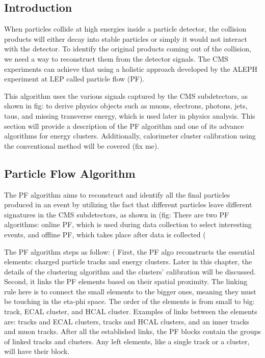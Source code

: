 \subsection{Introduction}
When particles collide at high energies inside a particle detector, the collision products will either decay into stable particles or simply it would not interact with the detector. To identify the original products coming out of the collision, we need a way to reconstruct them from the detector signals. The CMS experiments can achieve that using a holistic approach developed by the ALEPH experiment at LEP called particle flow (PF).

This algorithm uses the various signals captured by the CMS subdetectors, as shown in fig:%
to derive physics objects such as muons, electrons, photons, jets, taus, and missing transverse energy, which is used later in physics analysis. This section will provide a description of the PF algorithm and one of its advance algorithms for energy clusters. Additionally, calorimeter cluster calibration using the conventional method will be covered (fix me).

\subsection{Particle Flow Algorithm}
The PF algorithm aims to reconstruct and identify all the final particles produced in an event by utilizing the fact that different particles leave different signatures in the CMS subdetectors, as shown in (fig: %
There are two PF algorithms: online PF, which is used during data collection to select interesting events, and offline PF, which takes place after data is collected (%

The PF algorithm steps as follow: (%
First, the PF algo reconstructs the essential elements: charged particle tracks and energy clusters. Later in this chapter, the details of the clustering algorithm and the clusters' calibration will be discussed.  Second, it links the PF elements based on their spatial proximity. The linking rule here is to connect the small elements to the bigger ones, meaning they must be touching in the eta-phi space. The order of the elements is from small to big: track, ECAL cluster, and HCAL cluster. Examples of links between the elements are: tracks and ECAL clusters, tracks and HCAL clusters, and an inner tracks and muon tracks. After all the established links, the PF blocks contain the groups of linked tracks and clusters. Any left elements, like a single track or a cluster, will have their block.


